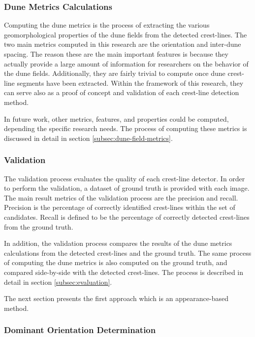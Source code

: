 \subsubsection*{Dune Metrics Calculations}
Computing the dune metrics is the process of extracting the various geomorphological properties of the dune fields from the detected crest-lines. The two main metrics computed in this research are the orientation and inter-dune spacing. The reason these are the main important features is because they actually provide a large amount of information for researchers on the behavior of the dune fields. Additionally, they are fairly trivial to compute once dune crest-line segments have been extracted. Within the framework of this research, they can serve also as a proof of concept and validation of each crest-line detection method. 

In future work, other metrics, features, and properties could be computed, depending the specific research needs. The process of computing these metrics is discussed in detail in section \ref{subsec:dune-field-metrics}.

\subsubsection*{Validation}
The validation process evaluates the quality of each crest-line detector. In order to perform the validation, a dataset of ground truth is provided with each image. The main result metrics of the validation process are the precision and recall. Precision is the percentage of correctly identified crest-lines within the set of candidates. Recall is defined to be the percentage of correctly detected crest-lines from the ground truth. 

In addition, the validation process compares the results of the dune metrics calculations from the detected crest-lines and the ground truth. The same process of computing the dune metrics is also computed on the ground truth, and compared side-by-side with the detected crest-lines. The process is described in detail in section \ref{subsec:evaluation}.

The next section presents the first approach which is an appearance-based method.



 \subsubsection*{Dominant Orientation Determination} \label{subsec:dominant_orientation}
 
